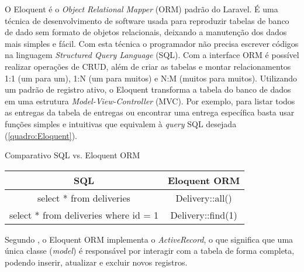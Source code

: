 O Eloquent é o \textit{Object Relational Mapper} (ORM) padrão do Laravel. É uma técnica de desenvolvimento de software usada para reproduzir tabelas de banco de dado sem formato de objetos relacionais, deixando a manutenção dos dados mais simples e fácil. Com esta técnica o programador não precisa escrever códigos na linguagem \textit{Structured Query Language} (SQL). Com a interface ORM é possível realizar operações de CRUD, além de criar as tabelas e montar relacionamentos 1:1 (um para um), 1:N (um para muitos) e N:M (muitos para muitos). Utilizando um padrão de registro ativo, o Eloquent transforma a tabela do banco de dados em uma estrutura \textit{Model-View-Controller} (MVC). Por exemplo, para listar todos as entregas da tabela de entregas ou encontrar uma entrega específica basta usar funções simples e intuitivas que equivalem à \textit{query} SQL desejada (\autoref{quadro:Eloquent}).

\begin{quadro}[H]
    \centering
    \caption{Comparativo SQL vs. Eloquent ORM
    \label{quadro:Eloquent}}
\begin{tabular}{|c|c|}
\hline
\textbf{SQL} & \textbf{Eloquent ORM} \\ \hline
select * from deliveries & Delivery::all() \\ \hline
select * from deliveries where id = 1 & Delivery::find(1) \\ \hline
\end{tabular}
\end{quadro}

Segundo , o Eloquent ORM implementa o \textit{ActiveRecord}, o que significa que uma única classe (\textit{model}) é responsável por interagir com a tabela de forma completa, podendo inserir, atualizar e excluir novos registros.